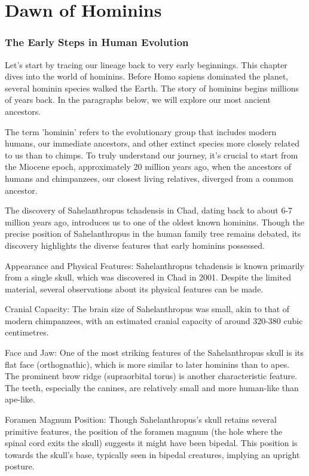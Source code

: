 \chapter{Dawn of Hominins}
\subsection*{The Early Steps in Human Evolution}
Let's start by tracing our lineage back to very early beginnings. This chapter dives into the world of hominins. Before Homo sapiens dominated the planet, several hominin species walked the Earth. The story of hominins begins millions of years back. In the paragraphs below, we will explore our most ancient ancestors.

The term 'hominin' refers to the evolutionary group that includes modern humans, our immediate ancestors, and other extinct species more closely related to us than to chimps. To truly understand our journey, it's crucial to start from the Miocene epoch, approximately 20 million years ago, when the ancestors of humans and chimpanzees, our closest living relatives, diverged from a common ancestor.

The discovery of Sahelanthropus tchadensis in Chad, dating back to about 6-7 million years ago, introduces us to one of the oldest known hominins. Though the precise position of Sahelanthropus in the human family tree remains debated, its discovery highlights the diverse features that early hominins possessed.

Appearance and Physical Features:  Sahelanthropus tchadensis is known primarily from a single skull, which was discovered in Chad in 2001. Despite the limited material, several observations about its physical features can be made.

Cranial Capacity: The brain size of Sahelanthropus was small, akin to that of modern chimpanzees, with an estimated cranial capacity of around 320-380 cubic centimetres.

Face and Jaw: One of the most striking features of the Sahelanthropus skull is its flat face (orthognathic), which is more similar to later hominins than to apes. The prominent brow ridge (supraorbital torus) is another characteristic feature. The teeth, especially the canines, are relatively small and more human-like than ape-like.

Foramen Magnum Position: Though Sahelanthropus's skull retains several primitive features, the position of the foramen magnum (the hole where the spinal cord exits the skull) suggests it might have been bipedal. This position is towards the skull's base, typically seen in bipedal creatures, implying an upright posture.

